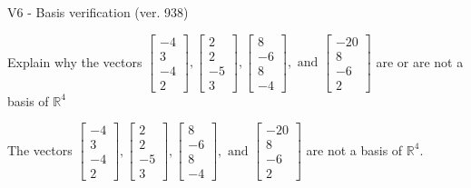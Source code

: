 \begin{exercise}
  \begin{exerciseTitle}V6 - Basis verification (ver. 938)\end{exerciseTitle}
  \begin{exerciseStatement}
    Explain why the vectors \(\left[\begin{array}{r}
-4 \\
3 \\
-4 \\
2
\end{array}\right] , \left[\begin{array}{r}
2 \\
2 \\
-5 \\
3
\end{array}\right] , \left[\begin{array}{r}
8 \\
-6 \\
8 \\
-4
\end{array}\right] , \text{ and } \left[\begin{array}{r}
-20 \\
8 \\
-6 \\
2
\end{array}\right]\) are or are not a basis of \(\mathbb{R}^4\)	


  \end{exerciseStatement}
  \begin{exerciseAnswer}
   The vectors \(\left[\begin{array}{r}
-4 \\
3 \\
-4 \\
2
\end{array}\right] , \left[\begin{array}{r}
2 \\
2 \\
-5 \\
3
\end{array}\right] , \left[\begin{array}{r}
8 \\
-6 \\
8 \\
-4
\end{array}\right] , \text{ and } \left[\begin{array}{r}
-20 \\
8 \\
-6 \\
2
\end{array}\right]\) 
  	 are not  a basis of \(\mathbb{R}^4\).
  


  \end{exerciseAnswer}
\end{exercise}
